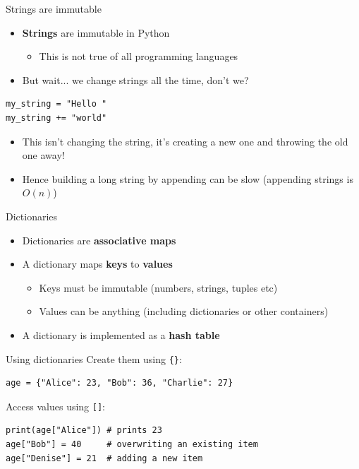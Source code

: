 \begin{frame}[fragile]{Strings are immutable}
	\begin{itemize}
		\pause\item \textbf{Strings} are immutable in Python
			\begin{itemize}
				\pause\item This is not true of all programming languages
			\end{itemize}
		\pause\item But wait... we change strings all the time, don't we?
	\end{itemize}
	\begin{lstlisting}
my_string = "Hello "
my_string += "world"
	\end{lstlisting}
	\begin{itemize}
		\pause\item This isn't changing the string, it's creating a new one and throwing the old one away!
		\pause\item Hence building a long string by appending can be slow (appending strings is $O(n)$)
	\end{itemize}
\end{frame}

\begin{frame}{Dictionaries}
	\begin{itemize}
		\pause\item Dictionaries are \textbf{associative maps}
		\pause\item A dictionary maps \textbf{keys} to \textbf{values}
			\begin{itemize}
				\pause\item Keys must be immutable (numbers, strings, tuples etc)
				\pause\item Values can be anything (including dictionaries or other containers)
			\end{itemize}
		\pause\item A dictionary is implemented as a \textbf{hash table}
	\end{itemize}		
\end{frame}

\begin{frame}[fragile]{Using dictionaries}
	\pause Create them using \lstinline|{}|:
	\begin{lstlisting}
age = {"Alice": 23, "Bob": 36, "Charlie": 27}
	\end{lstlisting}
	\pause Access values using \lstinline{[]}:
	\begin{lstlisting}
print(age["Alice"]) # prints 23
age["Bob"] = 40     # overwriting an existing item
age["Denise"] = 21  # adding a new item
	\end{lstlisting}
\end{frame}

